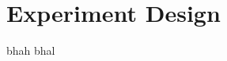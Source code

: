 \documentclass[../main/Self-Stabilization.tex]{subfiles}
\begin{document}
\section{Experiment Design}
bhah bhal
\end{document}
